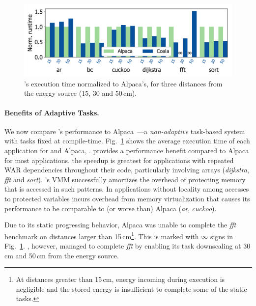 \begin{figure}
    \includegraphics[width=.8\columnwidth]{figures/coala_alpaca_gcc}
    \caption{\sys's execution time normalized to Alpaca's,
    for three distances from the energy source (15, 30 and 50\,cm). }
    \label{fig:runtime}
\end{figure}

\paragraph{Benefits of Adaptive Tasks.}
%
We now compare \sys's performance to Alpaca~\cite{alpaca}---a
\emph{non-adaptive} task-based system with tasks fixed at compile-time.
Fig.~\ref{fig:runtime} shows the average execution time of each
application for \sys and Alpaca, .
\sys provides a performance benefit compared to Alpaca for most
applications.   the speedup is greatest for applications with repeated WAR
dependencies throughout their code, particularly involving arrays
(\textit{dijkstra}, \textit{fft} and \textit{sort}). \sys's VMM
successfully amortizes the overhead of protecting memory that is accessed in
such patterns.  In applications without locality among accesses to protected
variables \sys incurs overhead from memory
virtualization that causes its performance to be comparable to (or worse than)
Alpaca (\textit{ar}, \textit{cuckoo}).

Due to its static progressing behavior, Alpaca was unable to complete the \textit{fft} benchmark on distances larger than 15\,cm\footnote{At distances greater than 15\,cm, energy incoming during
execution is negligible and the stored energy is insufficient to complete some of
the static tasks.}. This is marked with $\infty$ signs in Fig.~\ref{fig:runtime}. \sys, however, managed to complete \textit{fft} by enabling its task downscaling at 30\,cm and 50\,cm from the energy source.

